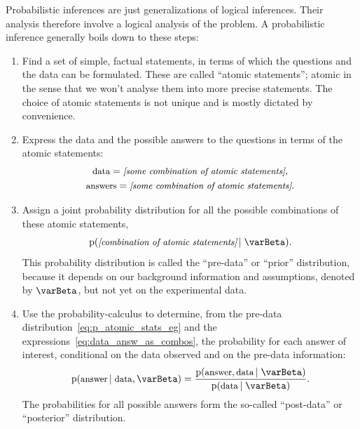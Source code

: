 \documentclass[\ifafour a4paper,12pt,\else a5paper,10pt,\fi%
onecolumn,oneside,article,%
british%
]{memoir}
\theoremstyle{remark}
\theoremstyle{innote}
\newcommand*{\pf}{\mathrm{p}}%
\renewcommand*{\|}[1][]{\nonscript\,#1\vert\nonscript\;\mathopen{}}
\newcommand*{\yI}{\varBeta}
\begin{document}
Probabilistic inferences are just generalizations of logical inferences.
Their analysis therefore involve a logical analysis of the problem. A
probabilistic inference generally boils down to these steps:
\begin{enumerate}[label=\arabic*.]
\item \label{item:step_statements} Find a set of simple, factual
  statements, in terms of which the questions and the data can be
  formulated. These are called \enquote{atomic statements}; atomic in the
  sense that we won't analyse them into more precise statements. The choice
  of atomic statements is not unique and is mostly dictated by convenience.

\item \label{item:step_formulate_question_data} Express the data and the
  possible answers to the questions in terms of the atomic statements:
  \begin{equation}
    \label{eq:data_answ_as_combos}
    \begin{gathered}
      \text{\small data} = \textit{\small[some combination of atomic statements]},
      \\
      \text{\small answers} =
      \textit{\small[some combination of atomic statements]}.
    \end{gathered}
  \end{equation}
  
\item \label{item:step_joint_prob} Assign a joint probability distribution
  for all the possible combinations of these atomic statements,
  \begin{equation}
    \label{eq:p_atomic_stats_eg}
    \pf(\textit{\small[combination of atomic statements]} \| \yI).
  \end{equation}
  This probability distribution is called the \enquote{pre-data} or
  \enquote{prior} distribution, because it depends on our background
  information and assumptions, denoted by $\yI$, but not yet on the
  experimental data.


\item \label{item:step_calculate_probabilities} Use the
  probability-calculus to determine, from the pre-data
  distribution~\eqref{eq:p_atomic_stats_eg} and the
  expressions~\eqref{eq:data_answ_as_combos}, the probability for each
  answer of interest, conditional on the data observed and on the pre-data
  information:
  \begin{equation}
    \label{eq:basic_conditional_prob}
    \pf(\text{\small answer} \| \text{\small data}, \yI)
    =
    \frac{\pf(\text{\small answer}, \text{\small data} \| \yI)}
    {\pf(\text{\small data} \| \yI)}.
  \end{equation}
  The probabilities for all possible answers form the so-called
  \enquote{post-data} or \enquote{posterior} distribution.
\end{enumerate}
\end{document}
